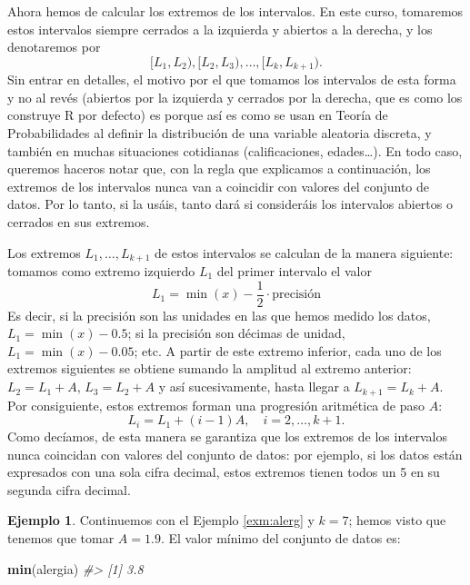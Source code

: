 \documentclass[
]{book}
\newenvironment{Shaded}{\begin{snugshade}}{\end{snugshade}}
\newcommand{\CommentTok}[1]{\textcolor[rgb]{0.56,0.35,0.01}{\textit{#1}}}
\newcommand{\KeywordTok}[1]{\textcolor[rgb]{0.13,0.29,0.53}{\textbf{#1}}}
\newcommand{\NormalTok}[1]{#1}
\theoremstyle{definition}
\theoremstyle{definition}
\newtheorem{example}{Ejemplo}[chapter]
\theoremstyle{definition}
\theoremstyle{remark}
\begin{document}
Ahora hemos de calcular los extremos de los intervalos. En este curso, tomaremos estos intervalos siempre cerrados a la izquierda y abiertos a la derecha, y los denotaremos por
\[
[L_1,L_2),[L_2,L_3),\ldots, [L_k,L_{k+1}).
\]
Sin entrar en detalles, el motivo por el que tomamos los intervalos de esta forma y no al revés (abiertos por la izquierda y cerrados por la derecha, que es como los construye R por defecto) es porque así es como se usan en Teoría de Probabilidades al definir la distribución de una variable aleatoria discreta, y también en muchas situaciones cotidianas (calificaciones, edades\ldots). En todo caso, queremos haceros notar que, con la regla que explicamos a continuación, los extremos de los intervalos nunca van a coincidir con valores del conjunto de datos. Por lo tanto, si la usáis, tanto dará si consideráis los intervalos abiertos o cerrados en sus extremos.

Los extremos \(L_1,\ldots,L_{k+1}\) de estos intervalos se calculan de la manera siguiente: tomamos como extremo izquierdo \(L_1\) del primer intervalo el valor
\[
L_1=\min(x)-\frac{1}{2}\cdot \text{precisión} 
\]
Es decir, si la precisión son las unidades en las que hemos medido los datos, \(L_1=\min(x)-0.5\); si la precisión son décimas de unidad, \(L_1=\min(x)-0.05\); etc. A partir de este extremo inferior, cada uno de los extremos siguientes se obtiene sumando la amplitud al extremo anterior: \(L_2=L_1+A\), \(L_3=L_{2}+A\) y así sucesivamente, hasta llegar a \(L_{k+1}=L_{k}+A\). Por consiguiente, estos extremos forman una progresión aritmética de paso \(A\):
\[
L_i=L_1+(i-1)A,\quad i=2,\ldots,k+1.
\]
Como decíamos, de esta manera se garantiza que los extremos de los intervalos nunca coincidan con valores del conjunto de datos: por ejemplo, si los datos están expresados con una sola cifra decimal, estos extremos tienen todos un 5 en su segunda cifra decimal.

\begin{example}
\protect\hypertarget{exm:unnamed-chunk-10}{}{\label{exm:unnamed-chunk-10} }Continuemos con el Ejemplo \ref{exm:alerg} y \(k=7\); hemos visto que tenemos que tomar \(A=1.9\). El valor mínimo del conjunto de datos es:
\end{example}

\begin{Shaded}
\begin{Highlighting}[]
\KeywordTok{min}\NormalTok{(alergia)}
\CommentTok{\#\textgreater{} [1] 3.8}
\end{Highlighting}
\end{Shaded}
\end{document}
